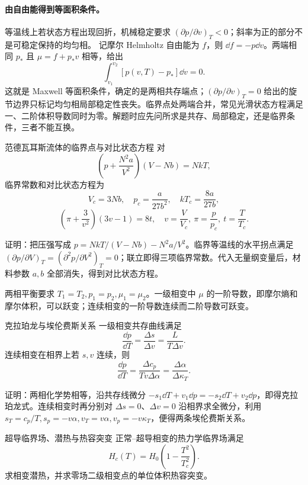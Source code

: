 {\paragraph{由自由能得到等面积条件。}
等温线上若状态方程出现回折，机械稳定要求 $(\partial p/\partial v)_T<0$；斜率为正的部分不是可稳定保持的均匀相。
记摩尔 Helmholtz 自由能为 $f$，则 $\dd f=-p\dd v$。两端相同 $p_*$ 且 $\mu=f+p_*v$ 相等，给出
\[
 \int_{v_1}^{v_2}[p(v,T)-p_*]\dd v=0.
\]
这就是 Maxwell 等面积条件，确定的是两相共存端点；$(\partial p/\partial v)_T=0$ 给出的旋节边界只标记均匀相局部稳定性丧失。临界点处两端合并，常见光滑状态方程满足一、二阶体积导数同时为零。解题时应先问所求是共存、局部稳定，还是临界条件，三者不能互换。


\begin{advtheorem}{范德瓦耳斯流体的临界点与对比状态方程}\label{advA2:thm:vdw}
对
\[
 \left(p+\frac{N^2a}{V^2}\right)(V-Nb)=NkT,
\]
临界常数和对比状态方程为
\[
 \boxed{V_c=3Nb,\quad p_c=\frac{a}{27b^2},\quad kT_c=\frac{8a}{27b}},
\]
\[
 \boxed{\left(\pi+\frac3{v^2}\right)(3v-1)=8t},
 \quad v=\frac V{V_c},\ \pi=\frac p{p_c},\ t=\frac T{T_c}.
\]
\end{advtheorem}
证明：把压强写成
$p=NkT/(V-Nb)-N^2a/V^2$。临界等温线的水平拐点满足
$(\partial p/\partial V)_T=(\partial^2p/\partial V^2)_T=0$；联立即得三项临界常数。代入无量纲变量后，材料参数 $a,b$ 全部消失，得到对比状态方程。

两相平衡要求 $T_1=T_2,p_1=p_2,\mu_1=\mu_2$。一级相变中 $\mu$ 的一阶导数，即摩尔熵和摩尔体积，可以跃变；连续相变的一阶导数连续而二阶导数可跃变。

\begin{advtheorem}{克拉珀龙与埃伦费斯关系}\label{advA2:thm:clapeyron}
一级相变共存曲线满足
\[
 \boxed{\frac{\dd p}{\dd T}=\frac{\Delta s}{\Delta v}=\frac{L}{T\Delta v}}.
\]
连续相变在相界上若 $s,v$ 连续，则
\[
 \boxed{\frac{\dd p}{\dd T}=\frac{\Delta c_p}{Tv\Delta\alpha}
 =\frac{\Delta\alpha}{\Delta\kappa_T}}.
\]
\end{advtheorem}
证明：两相化学势相等，沿共存线微分
$-s_1\dd T+v_1\dd p=-s_2\dd T+v_2\dd p$，即得克拉珀龙式。连续相变时再分别对 $\Delta s=0$、$\Delta v=0$ 沿相界求全微分，利用
$s_T=c_p/T,s_p=-v\alpha,v_T=v\alpha,v_p=-v\kappa_T$，便得两条埃伦费斯关系。

\begin{advexamplebox}{超导临界场、潜热与热容突变}\label{advA2:ex:superconducting-transition}
正常--超导相变的热力学临界场满足
\[
 H_c(T)=H_0\left(1-\frac{T^2}{T_c^2}\right).
\]
求相变潜热，并求零场二级相变点的单位体积热容突变。


\end{advexamplebox}}
